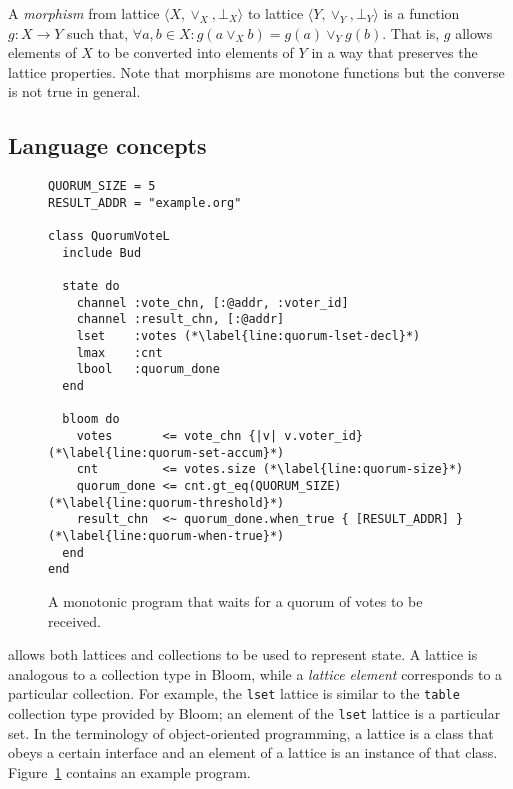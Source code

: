 A \emph{morphism} from lattice $\langle X, \lor_X, \bot_X\rangle$ to lattice
$\langle Y, \lor_Y, \bot_Y\rangle$ is a function $g: X \to Y$ such that,
$\forall a,b \in X: g(a \lor_X b) = g(a) \lor_Y g(b)$. That is, $g$ allows
elements of $X$ to be converted into elements of $Y$ in a way that preserves the
lattice properties.  Note that morphisms are monotone functions but the converse
is not true in general.

\subsection{Language concepts}
\begin{figure}[t]
\begin{scriptsize}
\begin{lstlisting}
QUORUM_SIZE = 5
RESULT_ADDR = "example.org"

class QuorumVoteL
  include Bud

  state do
    channel :vote_chn, [:@addr, :voter_id]
    channel :result_chn, [:@addr]
    lset    :votes (*\label{line:quorum-lset-decl}*)
    lmax    :cnt
    lbool   :quorum_done
  end

  bloom do
    votes       <= vote_chn {|v| v.voter_id} (*\label{line:quorum-set-accum}*)
    cnt         <= votes.size (*\label{line:quorum-size}*)
    quorum_done <= cnt.gt_eq(QUORUM_SIZE) (*\label{line:quorum-threshold}*)
    result_chn  <~ quorum_done.when_true { [RESULT_ADDR] } (*\label{line:quorum-when-true}*)
  end
end
\end{lstlisting}
\end{scriptsize}
\caption{A monotonic \lang program that waits for a quorum of votes to be received.}
\label{fig:lattice-quorum}
\end{figure}

\lang allows both lattices and collections to be used to represent state. A
lattice is analogous to a collection type in Bloom, while a \emph{lattice
  element} corresponds to a particular collection. For example, the
\texttt{lset} lattice is similar to the \texttt{table} collection type provided
by Bloom; an element of the \texttt{lset} lattice is a particular set. In the
terminology of object-oriented programming, a lattice is a class that obeys a
certain interface and an element of a lattice is an instance of that
class. Figure~\ref{fig:lattice-quorum} contains an example \lang program.

